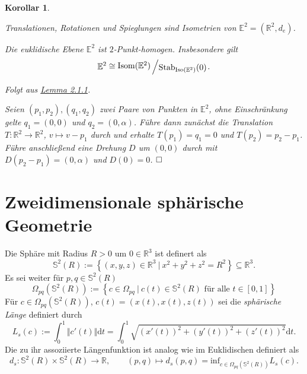 \documentclass[11pt]{book}
\numberwithin{dummy}{section}
\newtheorem{corollary}[theorem]{Korollar}
\theoremstyle{nonumberbreak}
\newenvironment{pr}[1][]{\ifthenelse{\equal{#1}{}}{\proof}{\proof[#1]}\rm}{\endproof}
\newcommand{\E}{\mathbb{E}}
\newcommand{\R}{\mathbb{R}}
\newcommand{\Sph}{\mathbb{S}}
\newcommand{\la}{\longrightarrow}
\newcommand{\slant}[2]{{\raisebox{.1em}{$#1$}\left/\raisebox{-.1em}{$#2$}\right.}}
\begin{document}
\begin{spacing}{1.4}
\begin{corollary}   %
\begin{compactenum}
\item Translationen, Rotationen und Spieglungen sind Isometrien von $\E^2 = (\R^2, d_e)$.
\item Die euklidische Ebene $\E^2$ ist $2$-Punkt-homogen. Insbesondere gilt $$\E^2 \cong \slant{\mathrm{Isom}(\E^2)}{\mathrm{Stab}_{\mathrm{Iso}(\E^2)}(0)}.$$
\end{compactenum}
\begin{pr}
\begin{compactenum}
\item Folgt aus \hyperlink{lemmazweieinseins}{Lemma 2.1.1}.
\item Seien $(p_1, p_2), (q_1, q_2)$ zwei Paare von Punkten in $\E^2$, ohne Einschränkung gelte $q_1= (0,0)$ und $q_2=(0,\alpha)$. Führe dann zunächst die Translation $T: \R^2 \la \R^2$, $v \mapsto v-p_1$ durch und erhalte $T(p_1) = q_1=0$ und $T(p_2) = p_2-p_1$. Führe anschließend eine Drehung $D$ um $(0,0)$ durch mit $D(p_2-p_1)= (0,\alpha)$ und $D(0)=0$.  $\hfill \Box$
\end{compactenum}
\end{pr}

\end{corollary}






\section{Zweidimensionale sphärische Geometrie} %





Die Sphäre mit Radius $R >0$ um $0 \in \R^3$ ist definert als
$$\Sph^2(R) := \left\{ (x,y,z) \in \R^3 \ \vert \ x^2+y^2+z^2 = R^2 \right\} \subseteq \R^3.$$
Es sei weiter für $p,q \in \Sph^2(R)$
$$\Omega_{pq}(\Sph^2(R)) := \left\{ c \in \Omega_{pq} \ \vert \ c(t) \in \Sph^2(R) \textrm{ für alle } t \in [0,1] \right\}$$
Für $c \in \Omega_{pq}(\Sph^2(R))$, $c(t) = (x(t), x(t), z(t))$ sei die \textit{sphärische Länge} definiert durch 
$$L_s(c) := \int_0^1 \Vert c'(t) \Vert \mathrm{d}t = \int_0^1 \sqrt{ (x'(t))^2 + (y'(t))^2 + (z'(t))^2 } \mathrm{d}t.$$
Die zu ihr assoziierte Längenfunktion ist analog wie im Euklidischen definiert als
$$d_s: \Sph^2(R) \times \Sph^2(R) \la \R, \qquad (p,q) \mapsto d_s(p,q) = \mathrm{inf}_{c \in \Omega_{pq}(\Sph^2(R))} L_s(c).$$



\end{spacing}
\end{document}

